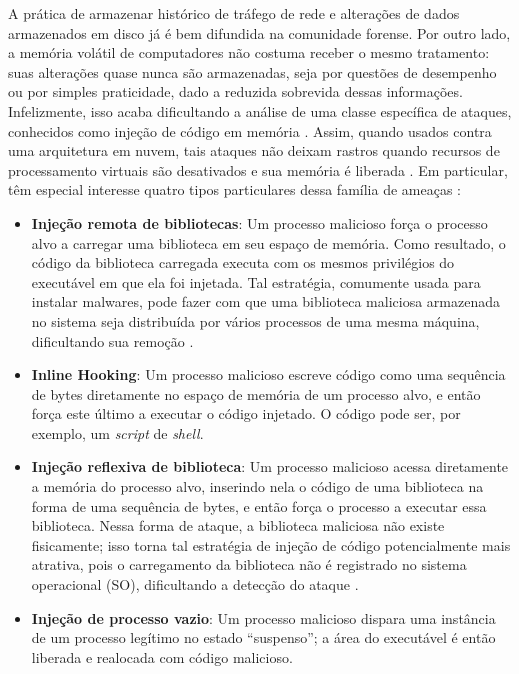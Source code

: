 A prática de armazenar histórico de tráfego de rede e alterações de dados armazenados em disco já é bem difundida na comunidade forense.
%
Por outro lado, a memória volátil de computadores não costuma receber o mesmo tratamento: suas alterações quase nunca são armazenadas, seja por questões de desempenho ou por simples praticidade, dado a reduzida sobrevida dessas informações.
%
Infelizmente, isso acaba dificultando a análise de uma classe específica de ataques, conhecidos como injeção de código em memória \cite{CaseMemoryForensics:2014}. 
%
Assim, quando usados contra uma arquitetura em nuvem, tais ataques não deixam rastros quando recursos de processamento virtuais são desativados e sua memória é liberada \cite{VomelMemoryAcquisition:2013,CaseMemoryForensics:2014}.
%
Em particular, têm especial interesse quatro tipos particulares dessa família de ameaças \cite{CaseMemoryForensics:2014}:


\begin{itemize}
 \item \textbf{Injeção remota de bibliotecas}: Um processo malicioso força o processo alvo a carregar uma biblioteca em seu espaço de memória.
 Como resultado, o código da biblioteca carregada executa com os mesmos privilégios do executável em que ela foi injetada. 
 Tal estratégia, comumente usada para instalar malwares, pode fazer com que uma biblioteca maliciosa armazenada no sistema seja distribuída por vários processos de uma mesma máquina, dificultando sua remoção \cite{MillerRemoteLibraryInjection:2004}.
 
 \item \textbf{Inline Hooking}: Um processo malicioso escreve código como uma sequência de bytes diretamente no espaço de memória de um processo alvo, e então força este último a executar o código injetado. 
 O código pode ser, por exemplo, um \textit{script} de \textit{shell}.
 

 \item \textbf{Injeção reflexiva de biblioteca}: Um processo malicioso acessa diretamente a memória do processo alvo, inserindo nela o código de uma biblioteca na forma de uma sequência de bytes, e então força o processo a executar essa biblioteca. 
 Nessa forma de ataque, a biblioteca maliciosa não existe fisicamente; isso torna tal estratégia de injeção de código potencialmente mais atrativa, pois o carregamento da biblioteca não é registrado no sistema operacional (SO), dificultando a detecção do ataque \cite{FewerReflectiveLibraryInject:2008}.
 
 \item \textbf{Injeção de processo vazio}: Um processo malicioso dispara uma instância de um processo legítimo no estado ``suspenso''; a área do executável é então liberada e realocada com código malicioso.
\end{itemize}


